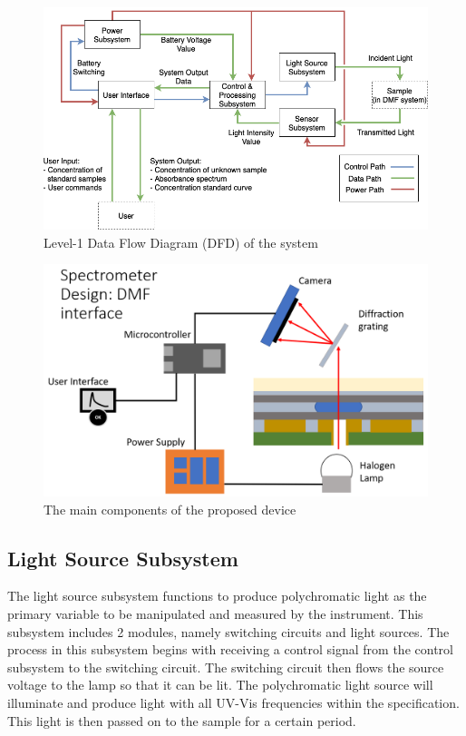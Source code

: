 \documentclass[conference]{IEEEtran}
\begin{document}
    \begin{figure}[htbp]
    \centerline{\includegraphics[scale=0.27]{system-dfd.png}}
    \caption{Level-1 Data Flow Diagram (DFD) of the system}
    \label{system-dfd}
    \end{figure}

    \begin{figure}[htbp]
    \centerline{\includegraphics[scale=0.27]{dmf-hardware-scheme.png}}
    \caption{The main components of the proposed device}
    \label{dmf-hardware-scheme}
    \end{figure}

\subsection{Light Source Subsystem}
The light source subsystem functions to produce polychromatic light as the primary variable to be manipulated and measured by the instrument.
This subsystem includes 2 modules, namely switching circuits and light sources.
The process in this subsystem begins with receiving a control signal from the control subsystem to the switching circuit.
The switching circuit then flows the source voltage to the lamp so that it can be lit.
The polychromatic light source will illuminate and produce light with all UV-Vis frequencies within the specification.
This light is then passed on to the sample for a certain period.
\end{document}
